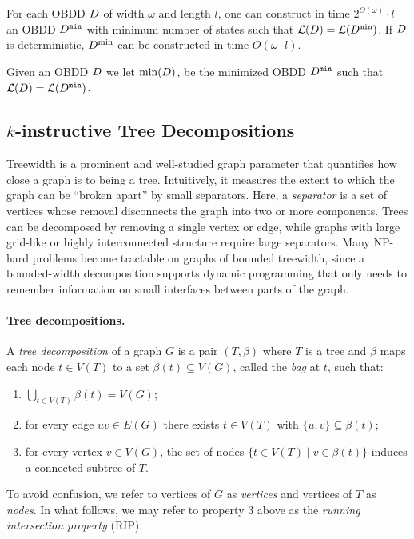 \begin{theorem}\label{theorem:Minimize} 
For each OBDD $D$ of width $\omega$ and length $l$, one can construct in time $2^{O(\omega)}\cdot l$ an OBDD $D^{\texttt{min}}$ with minimum number of states such that $\mathcal{L}(D) = \mathcal{L}(D^{\texttt{min}})$. If $D$ is deterministic, $D^{\min}$ can be constructed in time $O(\omega\cdot l)$. 
\label{theorem:}
    
\end{theorem}

Given an OBDD $D$ we let $\mathrm{min}(D)$, be the minimized OBDD $D^{\texttt{min}}$ such that $\mathcal{L}(D) = \mathcal{L}(D^{\texttt{min}})$.


\subsection{$k$-instructive Tree Decompositions} 
Treewidth is a prominent and well-studied graph parameter that quantifies how close a graph
is to being a tree. Intuitively, it measures the extent to which the graph can be ``broken apart''
by small separators. Here, a \emph{separator} is a set of vertices whose removal disconnects the
graph into two or more components. Trees can be decomposed by removing a single vertex or edge,
while graphs with large grid-like or highly interconnected structure require large separators. Many
NP-hard problems become tractable on graphs of bounded treewidth, since a bounded-width
decomposition supports dynamic programming that only needs to remember information on small
interfaces between parts of the graph.

\paragraph*{Tree decompositions.}
A \emph{tree decomposition} of a graph $G$ is a pair $(T,\beta)$ where $T$ is a tree and
$\beta$ maps each node $t\in V(T)$ to a set $\beta(t)\subseteq V(G)$, called the \emph{bag} at $t$,
such that:
\begin{enumerate}
    \item $\bigcup_{t\in V(T)} \beta(t) = V(G)$;
    \item for every edge $uv\in E(G)$ there exists $t\in V(T)$ with $\{u,v\}\subseteq \beta(t)$;
    \item for every vertex $v\in V(G)$, the set of nodes $\{t\in V(T)\mid v\in \beta(t)\}$
    induces a connected subtree of $T$.
\end{enumerate}
To avoid confusion, we refer to vertices of $G$ as \emph{vertices} and vertices of $T$ as
\emph{nodes}.
In what follows, we may refer to property 3 above as the \emph{running intersection property} (RIP).

